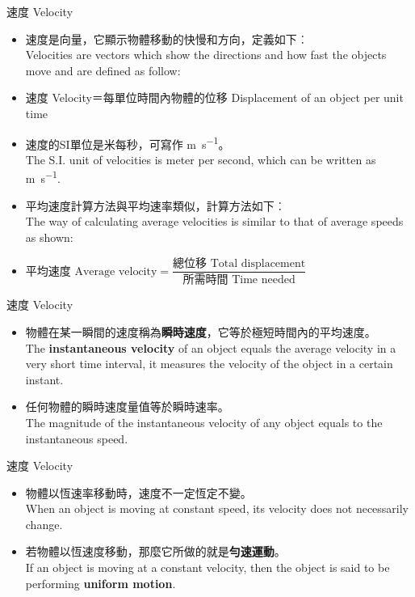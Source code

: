 \documentclass[beamer=true]{standalone}
\begin{document}
\begin{frame}{速度 Velocity}
    \begin{itemize}
        \item 速度是向量，它顯示物體移動的快慢和方向，定義如下︰ \\Velocities are vectors which show the directions and how fast the objects move and are defined as follow:
        \item 速度 Velocity＝每單位時間內物體的位移 Displacement of an object per unit time
        \item 速度的SI單位是米每秒，可寫作 \unit{m.s^{-1}}。 \\The S.I. unit of velocities is meter per second, which can be written as \unit{m.s^{-1}}.
        \item 平均速度計算方法與平均速率類似，計算方法如下︰ \\The way of calculating average velocities is similar to that of average speeds as shown:
        \item []$\textrm{平均速度 Average velocity}=\dfrac{\textrm{總位移 Total displacement}}{\textrm{所需時間 Time needed}}$
    \end{itemize}

\end{frame}

\begin{frame}{速度 Velocity}
    \begin{itemize}
        \item 物體在某一瞬間的速度稱為\textbf{瞬時速度}，它等於極短時間內的平均速度。\\The \textbf{instantaneous velocity} of an object equals the average velocity in a very short time interval, it measures the velocity of the object in a certain instant.
        \item 任何物體的瞬時速度量值等於瞬時速率。\\The magnitude of the instantaneous velocity of any object equals to the instantaneous speed.

    \end{itemize}

\end{frame}
\begin{frame}{速度 Velocity}
    \begin{itemize}

        \item 物體以恆速率移動時，速度不一定恆定不變。 \\When an object is moving at constant speed, its velocity does not necessarily change.
        \item 若物體以恆速度移動，那麼它所做的就是\textbf{勻速運動}。 \\If an object is moving at a constant velocity, then the object is said to be performing \textbf{uniform motion}.
    \end{itemize}

\end{frame}
\end{document}
